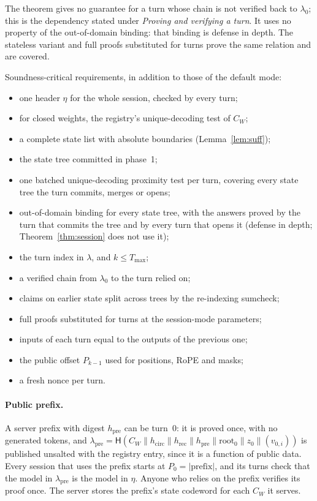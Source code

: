 \documentclass[11pt]{article}
\begin{document}
\noindent The theorem gives no guarantee for a turn whose chain is not verified back to \(\lambda_0\); this is the dependency stated under \emph{Proving and verifying a turn}.
It uses no property of the out-of-domain binding: that binding is defense in depth.
The stateless variant and full proofs substituted for turns prove the same relation and are covered.

Soundness-critical requirements, in addition to those of the default mode:
\begin{itemize}
\item one header \(\eta\) for the whole session, checked by every turn;
\item for closed weights, the registry's unique-decoding test of \(C_W\);
\item a complete state list with absolute boundaries (Lemma~\ref{lem:suff});
\item the state tree committed in phase~1;
\item one batched unique-decoding proximity test per turn, covering every state tree the turn commits, merges or opens;
\item out-of-domain binding for every state tree, with the answers proved by the turn that commits the tree and by every turn that opens it (defense in depth; Theorem~\ref{thm:session} does not use it);
\item the turn index in \(\lambda\), and \(k \le T_{\max}\);
\item a verified chain from \(\lambda_0\) to the turn relied on;
\item claims on earlier state split across trees by the re-indexing sumcheck;
\item full proofs substituted for turns at the session-mode parameters;
\item inputs of each turn equal to the outputs of the previous one;
\item the public offset \(P_{k-1}\) used for positions, RoPE and masks;
\item a fresh nonce per turn.
\end{itemize}

\paragraph{Public prefix.}
A server prefix with digest \(h_{\mathrm{pre}}\) can be turn~\(0\): it is proved once, with no generated tokens, and \(\lambda_{\mathrm{pre}} = \mathsf{H}(C_W \| h_{\mathrm{circ}} \| h_{\mathrm{rec}} \| h_{\mathrm{pre}} \| \mathrm{root}_0 \| z_0 \| (v_{0,i}))\) is published unsalted with the registry entry, since it is a function of public data.
Every session that uses the prefix starts at \(P_0 = |\text{prefix}|\), and its turns check that the model in \(\lambda_{\mathrm{pre}}\) is the model in \(\eta\).
Anyone who relies on the prefix verifies its proof once.
The server stores the prefix's state codeword for each \(C_W\) it serves.
\end{document}
